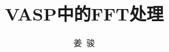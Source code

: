 
\title{\rm{VASP}中的\rm{FFT}处理}
\author[ ]{姜~骏}   %
\renewcommand*{\Authfont}{\small\rm} %
\renewcommand*{\Affilfont}{\small\it} %
\renewcommand\Authands{ and } %
\renewcommand\Authands{ , } %
\date{} %


\maketitle

